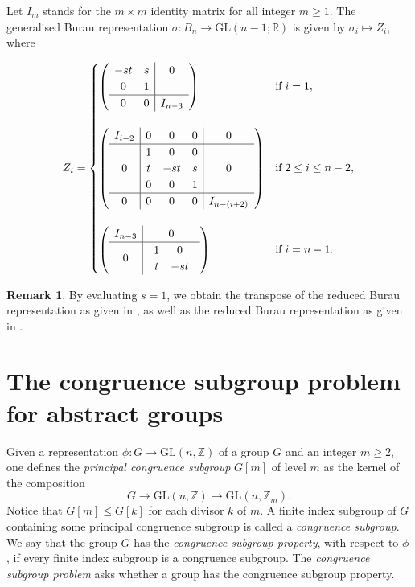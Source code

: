 \documentclass[12pt]{amsart}
\theoremstyle{definition}
\newtheorem{remark}[equation]{Remark}
\numberwithin{equation}{section}
\newcommand{\GL}{\mathrm{GL}}
\begin{document}
Let $I_m$ stands for the $m\times m$ identity matrix for all integer $m\geq 1$. The generalised Burau representation $\sigma: B_n \to \GL(n-1;\mathbb R)$ is given by $\sigma_i \mapsto Z_i$, where 
\begin{small}
\begin{equation*}
Z_i = 
\begin{cases}
\left(\begin{array}{cc|c}
-st & s & 0 \\
0 & 1 & \\
\hline 0 & 0 & I_{n-3}
\end{array}\right) & \text{if}\; i= 1,\\
\\
\left(\begin{array}{c|ccc|c}I_{i-2} & 0 & 0 & 0 & 0 \\ \hline & 1 & 0 & 0 &\\ 0 & t & -st & s & 0 \\ & 0 & 0 & 1 & \\ \hline 0 & 0 & 0 & 0 & I_{n-(i+2)}\end{array}\right) & \text{if}\;  2\leq i \leq n-2,\\
\\
\left(\begin{array}{c|c}
I_{n-3} & 0 \\
\hline
0 & \begin{array}{cc}
1 & 0 \\
t & -st
\end{array}
\end{array}\right) & \text{if}\; i= n-1.
\end{cases}
\end{equation*}
\end{small}
\begin{remark}
By evaluating $s=1$, we obtain the transpose of the reduced Burau representation as given in \cite[Theorem 3.9]{MR2435235}, as well as the reduced Burau representation as given in \cite[Lemma 3.11.1]{MR0375281}.  
\end{remark}
\medskip



\section{The congruence subgroup problem for abstract groups}\label{section 3}
Given a representation $\phi:G \to \mathrm{GL}(n, \mathbb{Z})$ of a group $G$ and an integer $m \ge 2$, one defines the {\it principal congruence subgroup} $G[m]$ of level $m$ as the kernel of the composition $$G \to \GL(n, \mathbb{Z}) \rightarrow \GL(n, \mathbb{Z}_m).$$ Notice that $G[m] \le G[k]$ for each divisor $k$ of $m$. A finite index subgroup of $G$ containing some principal congruence subgroup is called a {\it congruence subgroup}. We say that the group $G$ has the {\it congruence subgroup property}, with respect to $\phi$, if every finite index subgroup is a congruence subgroup. The {\it congruence subgroup problem} asks whether a group has the congruence subgroup property.
\end{document}
